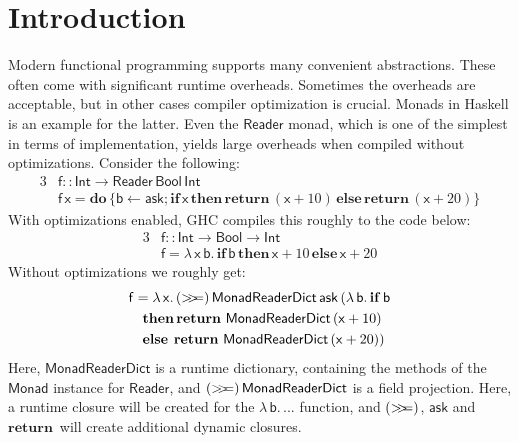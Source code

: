 \documentclass[acmsmall,screen,review,anonymous]{acmart}
\newcommand{\msf}[1]{{\mathsf{#1}}}
\newcommand{\mbf}[1]{{\mathbf{#1}}}
\newcommand{\mdo}{\mbf{do}\,}
\newcommand{\ind}{\hspace{1em}}
\newcommand{\bif}{\mbf{if}\,}
\newcommand{\bthen}{\mbf{then}\,}
\newcommand{\belse}{\mbf{else}\,}
\newcommand{\return}{\mbf{return}\,}
\newcommand{\lam}{\lambda\,}
\newcommand{\vb}{\mathsf{b}}
\newcommand{\vx}{\mathsf{x}}
\newcommand{\vf}{\mathsf{f}}
\newcommand{\Int}{\msf{Int}}
\newcommand{\Reader}{\msf{Reader}}
\newcommand{\Monad}{\msf{Monad}}
\newcommand{\Bool}{\msf{Bool}}
\newcommand{\fro}{\leftarrow}
\newcommand{\bind}{\mathbin{>\!\!>\mkern-6.7mu=}}
\theoremstyle{remark}
\begin{document}


\maketitle


\section{Introduction}\label{sec:introduction}

Modern functional programming supports many convenient abstractions. These often
come with significant runtime overheads. Sometimes the overheads are acceptable,
but in other cases compiler optimization is crucial. Monads in Haskell is an
example for the latter. Even the $\Reader$ monad, which is one of the simplest
in terms of implementation, yields large overheads when compiled without
optimizations. Consider the following:
\begin{alignat*}{3}
  &\vf :: \Int \to \Reader\,\Bool\,\Int \\
  &\vf\,\vx = \mdo\{\vb \fro \msf{ask}; \bif \vx\, \bthen \return (\vx + 10)\, \belse \return (\vx + 20)\}
\end{alignat*}
With optimizations enabled, GHC compiles this roughly to the code below:
\begin{alignat*}{3}
  &\vf :: \Int \to \Bool \to \Int \\
  &\vf = \lam \vx\,\vb.\, \bif \vb\, \bthen \vx + 10\, \belse \vx + 20
\end{alignat*}
Without optimizations we roughly get:
\begin{alignat*}{3}
  &\vf = \lam \vx.\,(\bind)\,\msf{MonadReaderDict}\,\msf{ask}\,(\lam \vb.\,\bif \vb\\
  &\ind \bthen\return\,\msf{MonadReaderDict}\,(\vx + 10)\\
  &\ind \belse\hspace{0.25em}\return\,\msf{MonadReaderDict}\,(\vx + 20))
\end{alignat*}
Here, $\msf{MonadReaderDict}$ is a runtime dictionary, containing the methods of
the $\Monad$ instance for $\Reader$, and $(\bind)\,\msf{MonadReaderDict}$ is a
field projection. Here, a runtime closure will be created for the $\lam \vb.\,...$
function, and $(\bind)$, $\msf{ask}$ and $\return$ will create additional dynamic
closures.
\end{document}
